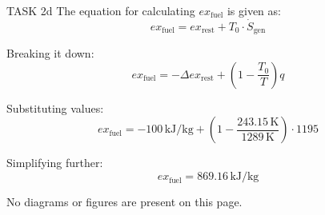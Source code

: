TASK 2d  
The equation for calculating \( ex_{\text{fuel}} \) is given as:  
\[
ex_{\text{fuel}} = ex_{\text{rest}} + T_0 \cdot \dot{S}_{\text{gen}}
\]  

Breaking it down:  
\[
ex_{\text{fuel}} = -\Delta ex_{\text{rest}} + \left( 1 - \frac{T_0}{T} \right) q
\]  

Substituting values:  
\[
ex_{\text{fuel}} = -100 \, \text{kJ/kg} + \left( 1 - \frac{243.15 \, \text{K}}{1289 \, \text{K}} \right) \cdot 1195
\]  

Simplifying further:  
\[
ex_{\text{fuel}} = 869.16 \, \text{kJ/kg}
\]  

No diagrams or figures are present on this page.